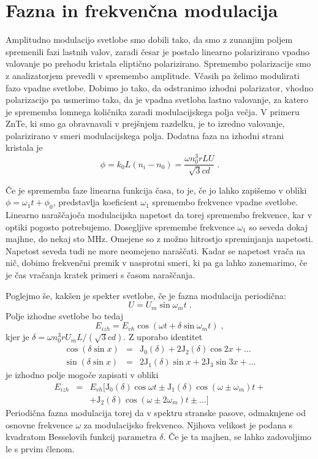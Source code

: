 \documentclass[11pt,fleqn]{book} %
\begin{document}
\section{Fazna in frekvenčna modulacija}

Amplitudno modulacijo svetlobe smo dobili tako, da smo z zunanjim
poljem spremenili fazi lastnih valov, zaradi česar je postalo linearno
polarizirano vpadno valovanje po prehodu kristala eliptično polarizirano.
Spremembo polarizacije smo z analizatorjem prevedli v spremembo amplitude.
Včasih pa želimo modulirati fazo vpadne svetlobe. Dobimo jo tako,
da odstranimo izhodni polarizator, vhodno polarizacijo pa usmerimo
tako, da je vpadna svetloba lastno valovanje, za katero je sprememba
lomnega količnika zaradi modulacijskega polja večja. V primeru ZnTe,
ki smo ga obravnavali v prejšnjem razdelku, je to izredno valovanje,
polarizirano v smeri modulacijskega polja. Dodatna faza na izhodni
strani kristala je 
\begin{equation}
\phi=k_{0}L(n_{i}-n_{0})=\frac{\omega n_{0}^{3}rLU}{\sqrt{3}cd}\;.\label{7.20}
\end{equation}


Če je sprememba faze linearna funkcija časa, to je, če jo lahko zapišemo
v obliki $\phi=\omega_{1}t+\phi_{0}$, predstavlja koeficient $\omega_{1}$
spremembo frekvence vpadne svetlobe. Linearno naraščajoča modulacijska
napetost da torej spremembo frekvence, kar v optiki pogosto potrebujemo.
Dosegljive spremembe frekvence $\omega_{1}$ so seveda dokaj majhne,
do nekaj sto MHz. Omejene so z možno hitrostjo spreminjanja napetosti.
Napetost seveda tudi ne more neomejeno naraščati. Kadar se napetost
vrača na nič, dobimo frekvenčni premik v nasprotni smeri, ki pa ga
lahko zanemarimo, če je čas vračanja kratek primeri s časom naraščanja.

Poglejmo še, kakšen je spekter svetlobe, če je fazna modulacija periodična:
\begin{equation}
U=U_{m}\sin\omega_{m}t\;.\label{7.21}
\end{equation}
 Polje izhodne svetlobe bo tedaj 
\begin{equation}
E_{izh}=E_{vh}\cos(\omega t+\delta\sin\omega_{m}t)\;,\label{7.22}
\end{equation}
 kjer je $\delta=\omega n_{0}^{3}rU_{m}L/(\sqrt{3}cd)$. Z uporabo
identitet 
\begin{eqnarray}
\cos(\delta\sin x) & = & \mbox{J}_{0}(\delta)+2\mbox{J}_{2}(\delta)\cos2x+\ldots\nonumber \\
\sin(\delta\sin x) & = & 2\mbox{J}_{1}(\delta)\sin x+2\mbox{J}_{3}\sin3x+\ldots
\end{eqnarray}
 je izhodno polje mogoče zapisati v obliki 
\begin{eqnarray}
E_{izh} & = & E_{vh}[\mbox{J}_{0}(\delta)\cos\omega t\pm\mbox{J}_{1}(\delta)\cos(\omega\pm\omega_{m})t+\nonumber \\
 &  & +\mbox{J}_{2}(\delta)\cos(\omega\pm2\omega_{m})t\pm\ldots]
\end{eqnarray}
 Periodična fazna modulacija torej da v spektru stranske pasove, odmaknjene
od osnovne frekvence $\omega$ za modulacijsko frekvenco. Njihova
velikost je podana s kvadratom Besselovih funkcij parametra $\delta$.
Če je ta majhen, se lahko zadovoljimo le s prvim členom.
\end{document}
